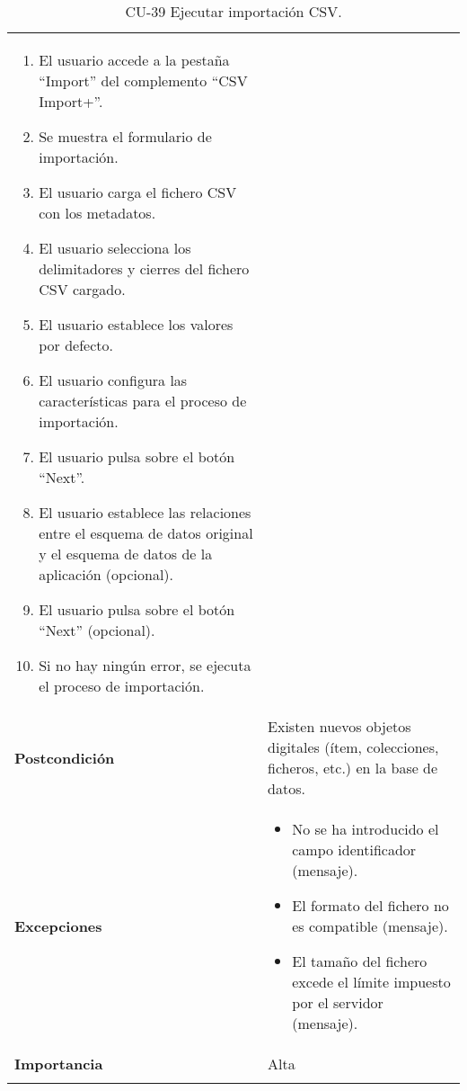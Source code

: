\begin{longtable}[]{@{}ll@{}}
\begin{minipage}[t]{0.78\columnwidth}
\begin{enumerate}
\def\labelenumi{\arabic{enumi}.}
\tightlist
\item
  El usuario accede a la pestaña ``Import'' del complemento ``CSV Import+''.
\item
  Se muestra el formulario de importación.
\item
  El usuario carga el fichero CSV con los metadatos.
\item
  El usuario selecciona los delimitadores y cierres del fichero CSV
  cargado.
\item
  El usuario establece los valores por defecto.
\item
  El usuario configura las características para el proceso de
  importación.
\item
  El usuario pulsa sobre el botón ``Next''.
\item
  El usuario establece las relaciones entre el esquema de datos original
  y el esquema de datos de la aplicación (opcional).
\item
  El usuario pulsa sobre el botón ``Next'' (opcional).
\item
  Si no hay ningún error, se ejecuta el proceso de importación.
\end{enumerate}\strut
\end{minipage}\tabularnewline
\begin{minipage}[t]{0.16\columnwidth}\raggedright
\textbf{Postcondición}\strut
\end{minipage} & \begin{minipage}[t]{0.78\columnwidth}\raggedright
Existen nuevos objetos digitales (ítem, colecciones, ficheros, etc.) en
la base de datos.\strut
\end{minipage}\tabularnewline
\begin{minipage}[t]{0.16\columnwidth}\raggedright
\textbf{Excepciones}\strut
\end{minipage} & \begin{minipage}[t]{0.78\columnwidth}\raggedright
\begin{itemize}
\tightlist
\item
  No se ha introducido el campo identificador (mensaje).
\item
  El formato del fichero no es compatible (mensaje).
\item
  El tamaño del fichero excede el límite impuesto por el servidor
  (mensaje).
\end{itemize}\strut
\end{minipage}\tabularnewline
\begin{minipage}[t]{0.16\columnwidth}\raggedright
\textbf{Importancia}\strut
\end{minipage} & \begin{minipage}[t]{0.78\columnwidth}\raggedright
Alta\strut
\end{minipage}\tabularnewline
\bottomrule
\caption{CU-39 Ejecutar importación CSV.}
\end{longtable}

